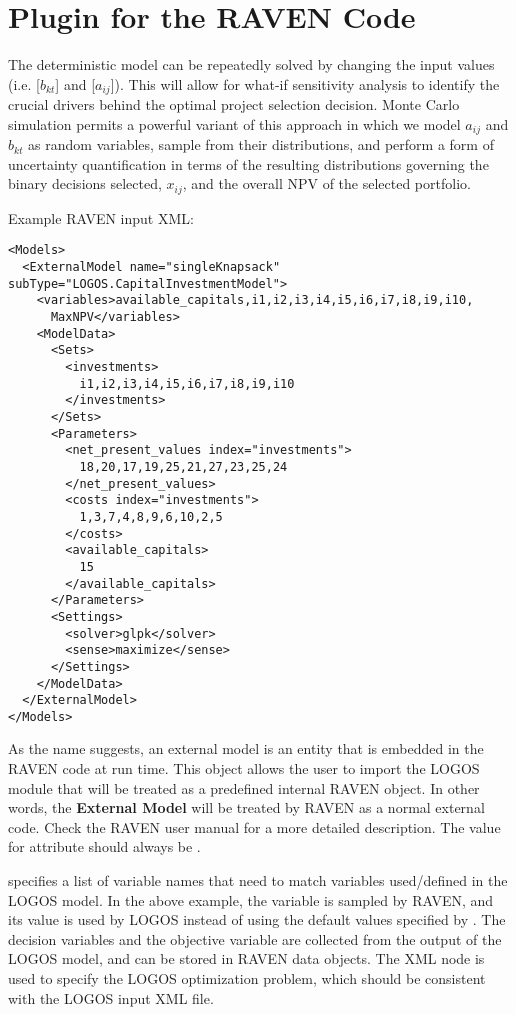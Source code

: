 \section{Plugin for the RAVEN Code}
\label{sec:RavenPlugin}

The deterministic model can be repeatedly solved by changing the input values (i.e.
 [$b_{kt}$] and  [$a_{ij}$]).
This will allow for what-if sensitivity analysis to identify the
crucial drivers behind the optimal project selection decision. Monte Carlo simulation permits a
powerful variant of this approach in which we model $a_{ij}$ and $b_{kt}$ as random
variables, sample from their distributions, and perform a form of uncertainty quantification
in terms of the resulting distributions governing the binary decisions selected, $x_{ij}$, and
the overall NPV of the selected portfolio.

Example RAVEN input  XML:
\begin{lstlisting}[style=XML]
<Models>
  <ExternalModel name="singleKnapsack" subType="LOGOS.CapitalInvestmentModel">
    <variables>available_capitals,i1,i2,i3,i4,i5,i6,i7,i8,i9,i10,
      MaxNPV</variables>
    <ModelData>
      <Sets>
        <investments>
          i1,i2,i3,i4,i5,i6,i7,i8,i9,i10
        </investments>
      </Sets>
      <Parameters>
        <net_present_values index="investments">
          18,20,17,19,25,21,27,23,25,24
        </net_present_values>
        <costs index="investments">
          1,3,7,4,8,9,6,10,2,5
        </costs>
        <available_capitals>
          15
        </available_capitals>
      </Parameters>
      <Settings>
        <solver>glpk</solver>
        <sense>maximize</sense>
      </Settings>
    </ModelData>
  </ExternalModel>
</Models>
\end{lstlisting}

As the name suggests, an external model is an entity that is embedded in the RAVEN
code at run time. This object allows the user to import the LOGOS module that will
be treated as a predefined internal RAVEN object. In other words, the
\textbf{External Model} will be treated by RAVEN as a normal external code.
Check the RAVEN user manual for a more detailed description.
\nb The value for attribute  should always be .

 specifies a list of variable names that need to match
variables used/defined in the LOGOS model. In the above example, the variable
 is sampled by RAVEN, and its value is used
by LOGOS instead of using the default values specified by .
The decision variables  and the
objective variable  are collected from the output of the LOGOS model,
and can be stored in RAVEN data objects.
The XML node  is used to specify the LOGOS optimization problem, which
should be consistent with the LOGOS input XML file.

